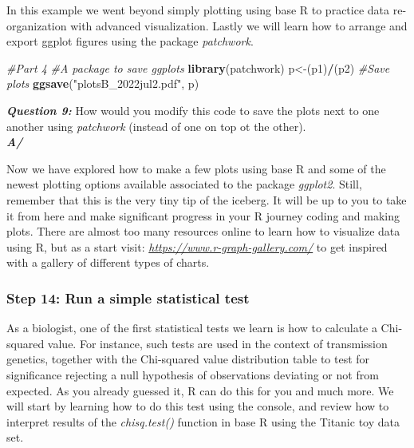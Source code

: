 \documentclass[]{article}
\newenvironment{Shaded}{\begin{snugshade}}{\end{snugshade}}
\newcommand{\CommentTok}[1]{\textcolor[rgb]{0.56,0.35,0.01}{\textit{#1}}}
\newcommand{\KeywordTok}[1]{\textcolor[rgb]{0.13,0.29,0.53}{\textbf{#1}}}
\newcommand{\NormalTok}[1]{#1}
\newcommand{\OperatorTok}[1]{\textcolor[rgb]{0.81,0.36,0.00}{\textbf{#1}}}
\newcommand{\StringTok}[1]{\textcolor[rgb]{0.31,0.60,0.02}{#1}}
\begin{document}
In this example we went beyond simply plotting using base R to practice
data re-organization with advanced visualization. Lastly we will learn
how to arrange and export ggplot figures using the package
\emph{patchwork}.

\begin{Shaded}
\begin{Highlighting}[]
\CommentTok{#Part 4}
\CommentTok{#A package to save ggplots}
\KeywordTok{library}\NormalTok{(patchwork)}
\NormalTok{p<-(p1)}\OperatorTok{/}\NormalTok{(p2)}
\CommentTok{#Save plots}
\KeywordTok{ggsave}\NormalTok{(}\StringTok{"plotsB_2022jul2.pdf"}\NormalTok{, p)}
\end{Highlighting}
\end{Shaded}

\textbf{\emph{Question 9:}} How would you modify this code to save the
plots next to one another using \emph{patchwork} (instead of one on top
ot the other).\\
\textbf{\emph{A/}}

Now we have explored how to make a few plots using base R and some of
the newest plotting options available associated to the package
\emph{ggplot2}. Still, remember that this is the very tiny tip of the
iceberg. It will be up to you to take it from here and make significant
progress in your R journey coding and making plots. There are almost too
many resources online to learn how to visualize data using R, but as a
start visit: \emph{\url{https://www.r-graph-gallery.com/}} to get
inspired with a gallery of different types of charts.

\hypertarget{step-14-run-a-simple-statistical-test}{%
\subsubsection{Step 14: Run a simple statistical
test}\label{step-14-run-a-simple-statistical-test}}

As a biologist, one of the first statistical tests we learn is how to
calculate a Chi-squared value. For instance, such tests are used in the
context of transmission genetics, together with the Chi-squared value
distribution table to test for significance rejecting a null hypothesis
of observations deviating or not from expected. As you already guessed
it, R can do this for you and much more. We will start by learning how
to do this test using the console, and review how to interpret results
of the \emph{chisq.test()} function in base R using the Titanic toy data
set.
\end{document}
